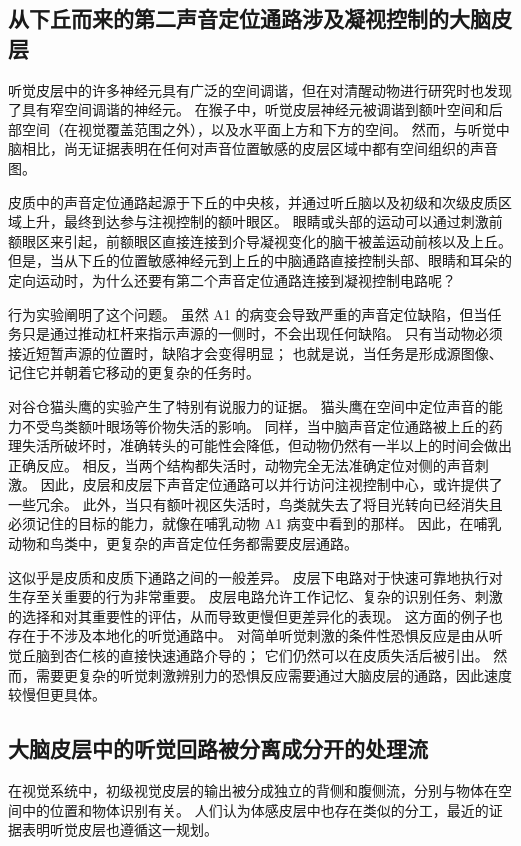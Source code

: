 \subsection{从下丘而来的第二声音定位通路涉及凝视控制的大脑皮层}
听觉皮层中的许多神经元具有广泛的空间调谐，但在对清醒动物进行研究时也发现了具有窄空间调谐的神经元。 
在猴子中，听觉皮层神经元被调谐到额叶空间和后部空间（在视觉覆盖范围之外），以及水平面上方和下方的空间。 
然而，与听觉中脑相比，尚无证据表明在任何对声音位置敏感的皮层区域中都有空间组织的声音图。

皮质中的声音定位通路起源于下丘的中央核，并通过听丘脑以及初级和次级皮质区域上升，最终到达参与注视控制的额叶眼区。 
眼睛或头部的运动可以通过刺激前额眼区来引起，前额眼区直接连接到介导凝视变化的脑干被盖运动前核以及上丘。 
但是，当从下丘的位置敏感神经元到上丘的中脑通路直接控制头部、眼睛和耳朵的定向运动时，为什么还要有第二个声音定位通路连接到凝视控制电路呢？

行为实验阐明了这个问题。 
虽然 A1 的病变会导致严重的声音定位缺陷，但当任务只是通过推动杠杆来指示声源的一侧时，不会出现任何缺陷。 
只有当动物必须接近短暂声源的位置时，缺陷才会变得明显； 也就是说，当任务是形成源图像、记住它并朝着它移动的更复杂的任务时。

对谷仓猫头鹰的实验产生了特别有说服力的证据。 
猫头鹰在空间中定位声音的能力不受鸟类额叶眼场等价物失活的影响。 
同样，当中脑声音定位通路被上丘的药理失活所破坏时，准确转头的可能性会降低，但动物仍然有一半以上的时间会做出正确反应。 
相反，当两个结构都失活时，动物完全无法准确定位对侧的声音刺激。 
因此，皮层和皮层下声音定位通路可以并行访问注视控制中心，或许提供了一些冗余。 
此外，当只有额叶视区失活时，鸟类就失去了将目光转向已经消失且必须记住的目标的能力，就像在哺乳动物 A1 病变中看到的那样。 
因此，在哺乳动物和鸟类中，更复杂的声音定位任务都需要皮层通路。

这似乎是皮质和皮质下通路之间的一般差异。 
皮层下电路对于快速可靠地执行对生存至关重要的行为非常重要。 
皮层电路允许工作记忆、复杂的识别任务、刺激的选择和对其重要性的评估，从而导致更慢但更差异化的表现。 
这方面的例子也存在于不涉及本地化的听觉通路中。 
对简单听觉刺激的条件性恐惧反应是由从听觉丘脑到杏仁核的直接快速通路介导的； 它们仍然可以在皮质失活后被引出。 
然而，需要更复杂的听觉刺激辨别力的恐惧反应需要通过大脑皮层的通路，因此速度较慢但更具体。

\subsection{大脑皮层中的听觉回路被分离成分开的处理流}
在视觉系统中，初级视觉皮层的输出被分成独立的背侧和腹侧流，分别与物体在空间中的位置和物体识别有关。 
人们认为体感皮层中也存在类似的分工，最近的证据表明听觉皮层也遵循这一规划。

